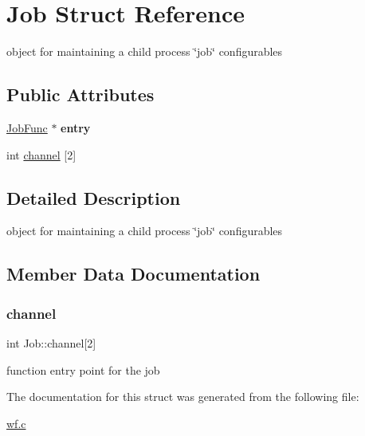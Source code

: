 \hypertarget{structJob}{}\section{Job Struct Reference}
\label{structJob}


object for maintaining a child process \char`\"{}job\char`\"{} configurables  


\subsection*{Public Attributes}
\begin{DoxyCompactItemize}
\item 
\mbox{\label{structJob_a6e1fe2a82540baa8c8ac9ef0b5d9c18d}} 
\mbox{\hyperlink{wf_8c_ad131b808f7b42fc3212215e62a999f4e}{Job\+Func}} $\ast$ {\bfseries entry}
\item 
int \mbox{\hyperlink{structJob_af6e787488a9267d2d2caa9d590f785da}{channel}} \mbox{[}2\mbox{]}
\end{DoxyCompactItemize}


\subsection{Detailed Description}
object for maintaining a child process \char`\"{}job\char`\"{} configurables 

\subsection{Member Data Documentation}
\mbox{\label{structJob_af6e787488a9267d2d2caa9d590f785da}} 
\subsubsection{\texorpdfstring{channel}{channel}}
{\footnotesize\ttfamily int Job\+::channel\mbox{[}2\mbox{]}}

function entry point for the job 

The documentation for this struct was generated from the following file\+:\begin{DoxyCompactItemize}
\item 
\mbox{\hyperlink{wf_8c}{wf.\+c}}\end{DoxyCompactItemize}
